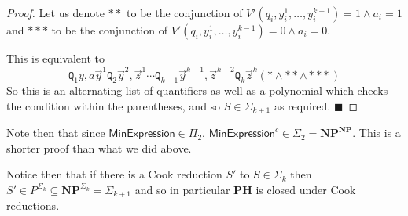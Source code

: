 \documentclass[10pt]{article}
\def\quant{\mathtt{Q}}
\def\minexpr{\mathsf{MinExpression}}
\def\PH{\mathbf{PH}}
\def\NP{\mathbf{NP}}
\def\qed{%
    \ifmmode%
        \eqno\blacksquare%
    \else%
        \hskip1cm\allowbreak\hbox{}\nobreak\hfill$\blacksquare$%
    \fi%
}
\begin{document}
\begin{proof}
    Let us denote $**$ to be the conjunction of $V'(q_i,y_i^1,\dots,y_i^{k-1})=1\land a_i=1$ and $***$ to be the conjunction of $V'(q_i,y_i^1,\dots,y_i^{k-1})=0\land a_i=0$.

    This is equivalent to
    \[ \quant_1 y,a \vec y^1 \quant_2 \vec y^2,\vec z^1 \cdots \quant_{k-1} \vec y^{k-1},\vec z^{k-2} \quant_k \vec z^k(*\land**\land***) \]
    So this is an alternating list of quantifiers as well as a polynomial which checks the condition within the parentheses, and so $S\in\Sigma_{k+1}$ as required.
    \qed

\end{proof}

Note then that since $\minexpr\in\Pi_2$, $\minexpr^c\in\Sigma_2=\NP^\NP$.
This is a shorter proof than what we did above.

Notice then that if there is a Cook reduction $S'$ to $S\in\Sigma_k$ then $S'\in P^{\Sigma_k}\subseteq\NP^{\Sigma_k}=\Sigma_{k+1}$ and so in particular $\PH$ is closed under Cook reductions.
\end{document}
